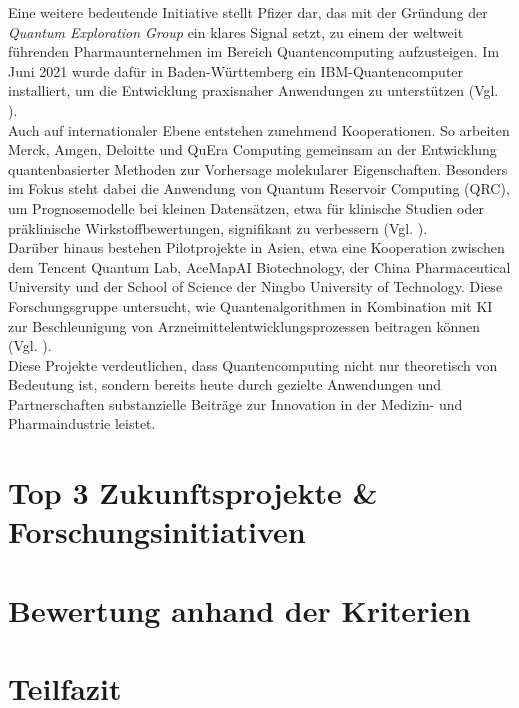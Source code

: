 Eine weitere bedeutende Initiative stellt Pfizer dar, das mit der Gründung der \textit{Quantum Exploration Group} ein klares Signal setzt, zu einem der weltweit führenden Pharmaunternehmen im Bereich Quantencomputing aufzusteigen. Im Juni 2021 wurde dafür in Baden-Württemberg ein IBM-Quantencomputer installiert, um die Entwicklung praxisnaher Anwendungen zu unterstützen (Vgl. \cite{papalitsas_quantum_2025}).\\

Auch auf internationaler Ebene entstehen zunehmend Kooperationen. So arbeiten Merck, Amgen, Deloitte und QuEra Computing gemeinsam an der Entwicklung quantenbasierter Methoden zur Vorhersage molekularer Eigenschaften. Besonders im Fokus steht dabei die Anwendung von Quantum Reservoir Computing (QRC), um Prognosemodelle bei kleinen Datensätzen, etwa für klinische Studien oder präklinische Wirkstoffbewertungen, signifikant zu verbessern (Vgl. \cite{beaulieu_robust_2024, kornjaca_large-scale_2024}).\\

Darüber hinaus bestehen Pilotprojekte in Asien, etwa eine Kooperation zwischen dem Tencent Quantum Lab, AceMapAI Biotechnology, der China Pharmaceutical University und der School of Science der Ningbo University of Technology. Diese Forschungsgruppe untersucht, wie Quantenalgorithmen in Kombination mit KI zur Beschleunigung von Arzneimittelentwicklungsprozessen beitragen können (Vgl. \cite{li_hybrid_2024}).\\

Diese Projekte verdeutlichen, dass Quantencomputing nicht nur theoretisch von Bedeutung ist, sondern bereits heute durch gezielte Anwendungen und Partnerschaften substanzielle Beiträge zur Innovation in der Medizin- und Pharmaindustrie leistet.












\section{Top 3 Zukunftsprojekte \& Forschungsinitiativen}


\section{Bewertung anhand der Kriterien}


\section{Teilfazit}


\printbibliography
